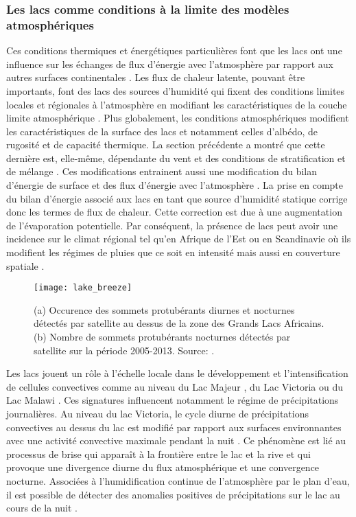 \subsubsection{{\selectfont Les lacs comme conditions à la limite des modèles atmosphériques}}

Ces conditions thermiques et énergétiques particulières font que les lacs ont une influence sur les échanges de flux d'énergie avec l'atmosphère par rapport aux autres surfaces continentales \citep{lemoigne2013,potes2017}. Les flux de chaleur latente, pouvant être importants, font des lacs des sources d’humidité qui fixent des conditions limites locales et régionales à l'atmosphère en modifiant les caractéristiques de la couche limite atmosphérique \citep{verburg2010,li2015,woolway2017b}. Plus globalement, les conditions atmosphériques modifient les caractéristiques de la surface des lacs et notamment celles d'albédo, de rugosité et de capacité thermique. La section précédente a montré que cette dernière est, elle-même, dépendante du vent et des conditions de stratification et de mélange \citep{bouffard2019}. Ces modifications entrainent aussi une modification du bilan d'énergie de surface et des flux d'énergie avec l'atmosphère \citep{dutra2010}. La prise en compte du bilan d'énergie associé aux lacs en tant que source d'humidité statique corrige donc les termes de flux de chaleur. Cette correction est due à une augmentation de l'évaporation potentielle. Par conséquent, la présence de lacs peut avoir une incidence sur le climat régional tel qu'en Afrique de l’Est ou en Scandinavie où ils modifient les régimes de pluies que ce soit en intensité mais aussi en couverture spatiale \citep{samuelsson2010,thiery2015}.\\

\begin{figure}[h!]
 \centerline{\texttt{[image: lake\_breeze]}}
 \caption{(a) Occurence des sommets protubérants diurnes et nocturnes détectés par satellite au dessus de la zone des Grands Lacs Africains. (b) Nombre de sommets protubérants nocturnes détectés par satellite sur la période 2005-2013. Source: \citet{thiery2017}.}
  \label{lake-breeze}
\end{figure}
\clearpage

Les lacs jouent un rôle à l'échelle locale dans le développement et l'intensification de cellules convectives comme au niveau du Lac Majeur \citep{pujol2011}, du Lac Victoria \citep{thiery2016} ou du Lac Malawi \citep{koseki2019}. Ces signatures influencent notamment le régime de précipitations journalières. Au niveau du lac Victoria, le cycle diurne de précipitations convectives au dessus du lac est modifié par rapport aux surfaces environnantes avec une activité convective maximale pendant la nuit \citep{thiery2017}. Ce phénomène est lié au processus de brise qui apparaît à la frontière entre le lac et la rive et qui provoque une divergence diurne du flux atmosphérique et une convergence nocturne. Associées à l'humidification continue de l'atmosphère par le plan d'eau, il est possible de détecter des anomalies positives de précipitations sur le lac au cours de la nuit \citep[figure \ref{lake-breeze},][]{thiery2016, koseki2019}.

